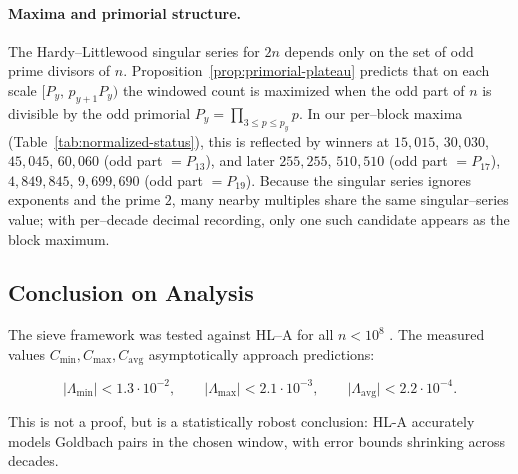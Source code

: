 \documentclass[11pt]{article}
\theoremstyle{inline}
\theoremstyle{break}
\theoremstyle{break}
\theoremstyle{break}
\theoremstyle{break}
\theoremstyle{break}
\theoremstyle{break}
\theoremstyle{break}
\theoremstyle{inline}
\newcommand{\xLambdaMinLimit}{1.3\cdot 10^{-2}} %
\newcommand{\xLambdaMaxLimit}{2.1\cdot 10^{-3}} %
\newcommand{\xLambdaAvgLimit}{2.2\cdot 10^{-4}} %
\newcommand{\tavg}{{\scriptscriptstyle\mathrm{avg}}}
\newcommand{\Cmeas}{C}              %
\begin{document}
\paragraph{Maxima and primorial structure.}
The Hardy–Littlewood singular series for \(2n\) depends only on the set of odd prime divisors of \(n\).
Proposition~\ref{prop:primorial-plateau} predicts that on each scale \([P_y,\,p_{y+1}P_y)\) the windowed count is maximized when the odd part of \(n\) is divisible by the odd primorial \(P_y=\prod_{3\le p\le p_y}p\).
In our per–block maxima (Table~\ref{tab:normalized-status}), this is reflected by winners at 
\(15{,}015\), \(30{,}030\), \(45{,}045\), \(60{,}060\) (odd part \(=P_{13}\)), 
and later \(255{,}255\), \(510{,}510\) (odd part \(=P_{17}\)), 
\(4{,}849{,}845\), \(9{,}699{,}690\) (odd part \(=P_{19}\)).
Because the singular series ignores exponents and the prime \(2\), many nearby multiples share the same singular–series value; with per–decade decimal recording, only one such candidate appears as the block maximum.


\subsection*{Conclusion on Analysis}

The sieve framework was tested against HL–A for all \( n<10^8 \) . The measured values \( \Cmeas_{\min},\Cmeas_{\max},\Cmeas_{\tavg} \) asymptotically approach predictions:

\begin{equation}
\lvert \Lambda_{\min} \rvert < \xLambdaMinLimit,\qquad
\lvert \Lambda_{\max} \rvert < \xLambdaMaxLimit,\qquad
\lvert \Lambda_{\tavg} \rvert < \xLambdaAvgLimit.
\end{equation}

This is not a proof, but is a statistically robost conclusion: HL-A accurately models Goldbach pairs in the chosen window, with error bounds shrinking across decades.
\end{document}
